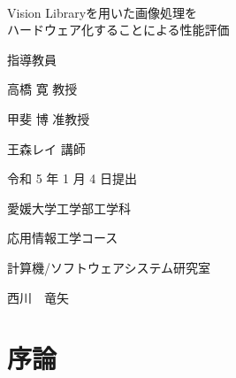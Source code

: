\documentclass[11pt,a4j]{jreport}
\begin{document}
\thispagestyle{empty}
\begin{center}
\
\vspace{3cm}

{\huge{Vision Libraryを用いた画像処理を\\
ハードウェア化することによる性能評価}}

\vspace{9mm}

{\LARGE 指導教員}

\vspace{5mm}

{\LARGE 高橋 寛 教授}

\vspace{4mm}

{\LARGE 甲斐 博 准教授}

\vspace{4mm}

{\LARGE 王森レイ 講師}

\vspace{20mm}

{\LARGE 令和 5 年 1 月 4 日提出}\\

\vspace{20mm}

{\LARGE 愛媛大学工学部工学科}\\

\vspace{4mm}

{\LARGE 応用情報工学コース}\\

\vspace{4mm}

{\LARGE 計算機/ソフトウェアシステム研究室}\\

\vspace{18mm}

{\huge 西川　竜矢}\\

\end{center}

\thispagestyle{empty}
\clearpage

\tableofcontents

\pagestyle{fancy}
\lhead{\rightmark}
\renewcommand{\chaptermark}[1]{\markboth{第\ \normalfont\thechapter\ 章~~#1}{}}

\chapter{序論} %
\end{document}
